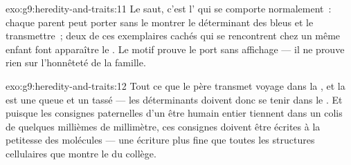 \begin{solution}{exo:g9:heredity-and-traits:11}
Le saut, c'est l' qui se comporte normalement~:
chaque parent peut porter sans le montrer le déterminant
des  bleus et le transmettre~; deux de ces exemplaires
cachés qui se rencontrent chez un même enfant font
apparaître le . Le motif prouve le port sans
affichage --- il ne prouve rien sur l'honnêteté de la
famille.
\end{solution}

\begin{solution}{exo:g9:heredity-and-traits:12}
Tout ce que le père transmet voyage dans la ,
et la  est une queue et un  tassé --- les
déterminants doivent donc se tenir dans le . Et
puisque les consignes paternelles d'un être humain entier
tiennent dans un colis de quelques millièmes de
millimètre, ces consignes doivent être écrites à la
petitesse des molécules --- une écriture plus fine que
toutes les structures cellulaires que montre le 
du collège.
\end{solution}

